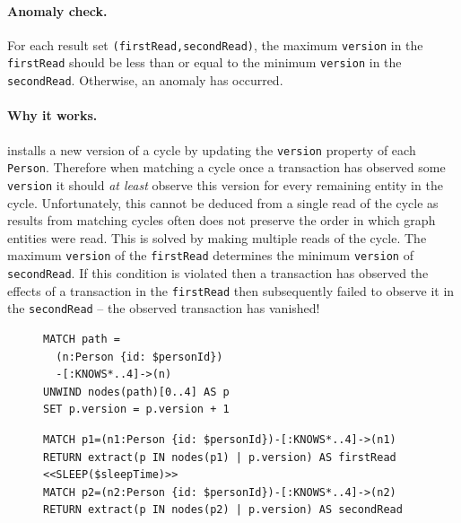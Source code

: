 \paragraph{Anomaly check.}
For each  result set \texttt{(firstRead,secondRead)}, the maximum \texttt{version} in the \texttt{firstRead} should be less than or equal to the minimum \texttt{version} in the \texttt{secondRead}.
Otherwise, an  anomaly has occurred.

\paragraph{Why it works.}
 installs a new version of a cycle by updating the \texttt{version} property of each \texttt{Person}.
Therefore when matching a cycle once a transaction has observed some \texttt{version} it should \emph{at least} observe this version for every remaining entity in the cycle.
Unfortunately, this cannot be deduced from a single read of the cycle as results from matching cycles often does not preserve the order in which graph entities were read.
This is solved by making multiple reads of the cycle.
The maximum \texttt{version} of the \texttt{firstRead} determines the minimum \texttt{version} of \texttt{secondRead}.
If this condition is violated then a transaction has observed the effects of a transaction in the \texttt{firstRead} then subsequently failed to observe it in the \texttt{secondRead} -- the observed transaction has vanished!


\begin{figure}[htb]
\centering
\begin{minipage}{0.33\linewidth}
\begin{lstlisting}[language=cypher,label=fig:otvfr1,caption=\tx{OTV/FR $T_\mathrm{W}$}.]
MATCH path =
  (n:Person {id: $personId})
  -[:KNOWS*..4]->(n)
UNWIND nodes(path)[0..4] AS p
SET p.version = p.version + 1
\end{lstlisting}
\end{minipage}
\quad
\begin{minipage}{0.60\linewidth}
\begin{lstlisting}[language=cypher,label=fig:otvfr2,caption=\tx{OTV/FR $T_\mathrm{R}$}.]
MATCH p1=(n1:Person {id: $personId})-[:KNOWS*..4]->(n1)
RETURN extract(p IN nodes(p1) | p.version) AS firstRead
<<SLEEP($sleepTime)>>
MATCH p2=(n2:Person {id: $personId})-[:KNOWS*..4]->(n2)
RETURN extract(p IN nodes(p2) | p.version) AS secondRead
\end{lstlisting}
\end{minipage}
\end{figure}


